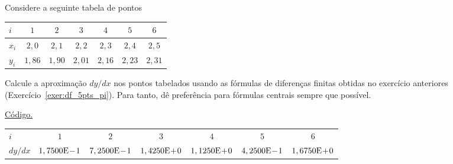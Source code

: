 \begin{exer}\label{exer:dfh4_tab}
  Considere a seguinte tabela de pontos
  \begin{center}
    \begin{tabular}{l|cccccc}
      $i$ & $1$ & $2$ & $3$ & $4$ & $5$ & $6$ \\\hline
      $x_i$ & $2,0$ & $2,1$ & $2,2$ & $2,3$ & $2,4$ & $2,5$ \\
      $y_i$ & $1,86$ & $1,90$ & $2,01$ & $2,16$ & $2,23$ & $2,31$ \\\hline
    \end{tabular}
  \end{center}
Calcule a aproximação $dy/dx$ nos pontos tabelados usando as fórmulas de diferenças finitas obtidas no exercício anteriores (Exercício~\ref{exer:df_5pts_pi}). Para tanto, dê preferência para fórmulas centrais sempre que possível.
\end{exer}
\begin{resp}
  \ifisoctave 
  \href{https://github.com/phkonzen/notas/blob/master/src/MatematicaNumerica/cap_deriv/dados/exer_dfh4_tab/exer_dfh4_tab.m}{Código.} 
  \fi
  \begin{tiny}
    \begin{center}
      \begin{tabular}{l|cccccc}\hline
        $i$ & $1$ & $2$ & $3$ & $4$ & $5$ & $6$ \\
        $dy/dx$ & $1,7500\mathrm{E}\!-\!1$ & $7,2500\mathrm{E}\!-\!1$ & $1,4250\mathrm{E}\!+\!0$ & $1,1250\mathrm{E}\!+\!0$ & $4,2500\mathrm{E}\!-\!1$ & $1,6750\mathrm{E}\!+\!0$ \\\hline
      \end{tabular}
    \end{center}
  \end{tiny}
\end{resp}
